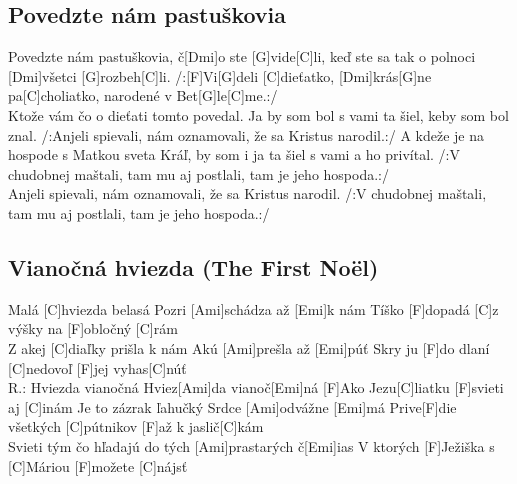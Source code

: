 \documentclass[10pt]{article}
\begin{document}
\begin{Large}
\begin{minipage}{\textwidth}
\subsection{Povedzte nám pastuškovia}
\begin{multicols}{2}
\begin{guitar}
	[C]Povedzte nám pastuškovia, č[Dmi]o ste [G]vide[C]li,
	keď ste sa tak o polnoci [Dmi]všetci [G]rozbeh[C]li.
	/:[F]Vi[G]deli [C]dieťatko, [Dmi]krás[G]ne pa[C]choliatko,
	narodené v Bet[G]le[C]me.:/
	\\
	Ktože vám čo o dieťati tomto povedal.
	Ja by som bol s vami ta šiel, 
	keby som bol znal.
	/:Anjeli spievali, nám oznamovali,
	že sa Kristus narodil.:/
	\columnbreak
	A kdeže je na hospode s Matkou sveta Kráľ,
	by som i ja ta šiel s vami a ho privítal.
	/:V chudobnej maštali, tam mu aj postlali,
	tam je jeho hospoda.:/
	\\
	Anjeli spievali, nám oznamovali,
	že sa Kristus narodil.
	/:V chudobnej maštali, tam mu aj postlali,
	tam je jeho hospoda.:/
\end{guitar}
\end{multicols}
\end{minipage}

\begin{minipage}{\textwidth}
\subsection{Vianočná hviezda (The First Noël)}
\begin{multicols}{2}
\begin{guitar}
	Malá [C]hviezda belasá
	Pozri [Ami]schádza až [Emi]k nám
	Tíško [F]dopadá [C]z výšky na [F]obločný [C]rám
	\\
	Z akej [C]diaľky prišla k nám
	Akú [Ami]prešla až [Emi]púť
	Skry ju [F]do dlaní [C]nedovoľ [F]jej vyhas[C]núť
	\\
	R.: Hviezda vianočná
	Hviez[Ami]da vianoč[Emi]ná
	[F]Ako Jezu[C]liatku [F]svieti aj [C]inám
	\columnbreak
	[C]Je to zázrak ľahučký
	Srdce [Ami]odvážne [Emi]má
	Prive[F]die všetkých [C]pútnikov [F]až k jaslič[C]kám
	\\
	Svieti tým čo hľadajú
	do tých [Ami]prastarých č[Emi]ias
	V ktorých [F]Ježiška s [C]Máriou [F]možete [C]nájsť
\end{guitar}
\end{multicols}
\end{minipage}

\begin{minipage}{\textwidth}

\end{minipage}
\end{Large}
\end{document}
